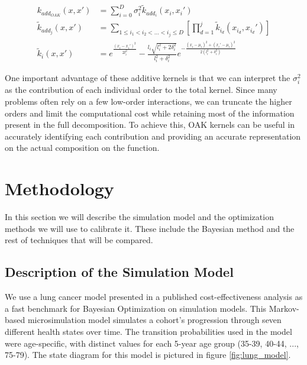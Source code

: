 \documentclass{IOS-Book-Article}
\begin{document}
	\begin{equation} \label{eq:additive-orthogonal}
		\begin{aligned}
			k_{add_{OAK}}(x,x') &= \sum_{i=0}^D{\sigma_i^2  \tilde{k}_{add_i}(x_i,x_i')} \\
			\tilde{k}_{add_j}(x,x') &= \sum_{1\leq i_1 < i_2 < \ldots < i_j\leq D} \left[\prod_{d=1}^{j} \tilde{k}_{i_d}(x_{i_d},x_{i_d}') \right]\\		
			\tilde{k}_i(x,x') &= e^{\frac{(x_i-x_i')^2}{2l_i^2}} - \frac{l_i\sqrt{l_i^2 + 2\delta_i^2}}{l_i^2 + \delta_i^2} e^{-\frac{(x_i-\mu_i)^2 + (x_i'-\mu_i)^2}{2(l_i^2 + \delta_i^2)}}
		\end{aligned}
	\end{equation}
	
	One important advantage of these additive kernels is that we can interpret the $\sigma_i^2$ as the contribution of each individual order to the total kernel. Since many problems often rely on a few low-order interactions, we can truncate the higher orders and limit the computational cost while retaining most of the information present in the full decomposition. To achieve this, OAK kernels can be useful in accurately identifying each contribution and providing an accurate representation on the actual composition on the function.
	
	\section{Methodology}
	In this section we will describe the simulation model and the optimization methods we will use to calibrate it. These include the Bayesian method and the rest of techniques that will be compared.
	
	\subsection{Description of the Simulation Model}
	\label{sec:simulation-model}
	We use a lung cancer model presented in a published cost-effectiveness analysis\cite{lung-model} as a fast benchmark for Bayesian Optimization on simulation models. This Markov-based microsimulation model simulates a cohort's progression through seven different health states over time. The transition probabilities used in the model were age-specific, with distinct values for each 5-year age group (35-39, 40-44, ..., 75-79). The state diagram for this model is pictured in figure \ref{fig:lung_model}.
	
\end{document}
